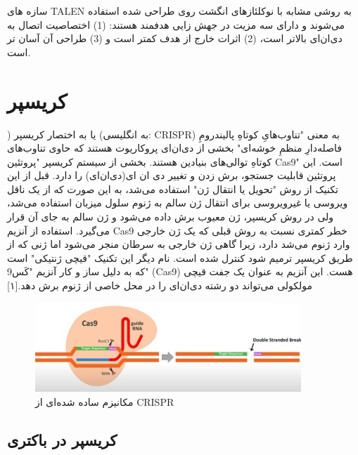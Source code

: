 \documentclass[12pt,a4paper,BCOR=.7cm,headsepline,bibliography=totoc]{report}
\begin{document}
سازه های TALEN به روشی مشابه با نوکلئازهای انگشت روی طراحی شده استفاده می‌شوند و دارای سه مزیت در جهش زایی هدفمند هستند: (1) اختصاصیت اتصال به دی‌ان‌ای بالاتر است، (2) اثرات خارج از هدف کمتر است و (3) طراحی آن آسان تر است.
\section{کریسپر}
) یا به اختصار کریسپر (به انگلیسی: CRISPR) به معنی "تناوب‌هایِ کوتاهِ پالیندرومِ فاصله‌دارِ منظمِ خوشه‌ای" بخشی از دی‌ان‌ای پروکاریوت هستند که حاوی تناوب‌های کوتاهِ توالی‌های بنیادین هستند. بخشی از سیستم کریسپر "پروتئین Cas9" است. این پروتئین قابلیت جستجو، برش زدن و تغییر دی ان ای(دی‌ان‌ای) را دارد. قبل از این تکنیک از روش "تحویل یا انتقال ژن" استفاده می‌شد، به این صورت که از یک ناقل ویروسی یا غیرویروسی برای انتقال ژن سالم به ژنوم سلول میزبان استفاده می‌شد، ولی در روش کریسپر، ژن معیوب برش داده می‌شود و ژن سالم به جای آن قرار می‌گیرد. استفاده از آنزیم Cas9 خطر کمتری نسبت به روش قبلی که یک ژن خارجی وارد ژنوم می‌شد دارد، زیرا گاهی ژن خارجی به سرطان منجر می‌شود اما ژنی که از طریق کریسپر ترمیم شود کنترل شده است. نام دیگر این تکنیک "قیچی ژنتیکی" است که به دلیل ساز و کار آنزیم "کَس9" (Cas9) هست. این آنزیم به عنوان یک جفت قیچی مولکولی می‌تواند دو رشته دی‌ان‌ای را در محل خاصی از ژنوم برش دهد.[۱]
\begin{figure}[!h]
\centering
\includegraphics[width=10cm, ]{pictures/simple_crispr.jpg}
\caption{
مکانیزم ساده شده‌ای از CRISPR \cite{graph4}
}\label{fig:1}
\end{figure}

\subsection{کریسپر در باکتری}
\end{document}
